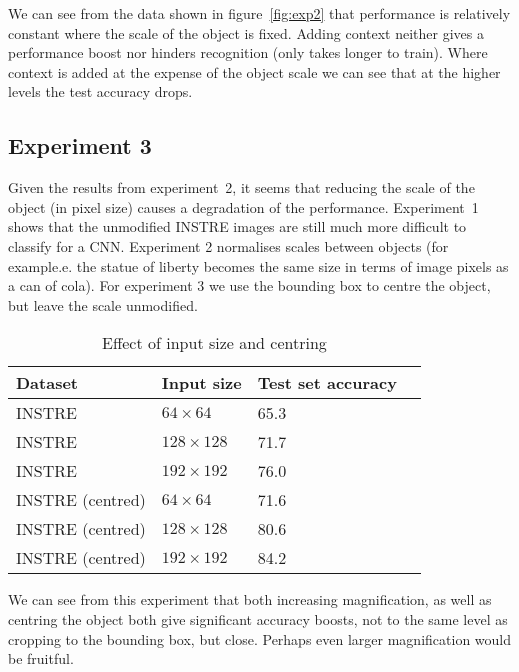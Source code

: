 We can see from the data shown in figure~\ref{fig:exp2} that performance is relatively constant where the scale of the object is fixed. Adding context neither gives a performance boost nor hinders recognition (only takes longer to train). Where context is added at the expense of the object scale we can see that at the higher levels the test accuracy drops.


\subsection {Experiment 3}

Given the results from experiment~2, it seems that reducing the scale of the object (in pixel size) causes a degradation of the performance. Experiment~1 shows that the unmodified INSTRE images are still much more difficult to classify for a CNN. Experiment 2 normalises scales between objects (for example.e. the statue of liberty becomes the same size in terms of image pixels as a can of cola). For experiment 3 we use the bounding box to centre the object, but leave the scale unmodified.


\begin{table}[h]
  \centering
    \caption{Effect of input size and centring}
    
  \begin{tabular}{ l l l l }
    
    Dataset & Input size & Test set accuracy \\
    \toprule
    
    INSTRE &  $ 64 \times 64 $ & 65.3 \\
    INSTRE &  $ 128 \times 128 $  & 71.7 \\
    INSTRE &  $ 192 \times 192 $  & 76.0 \\
    
    \toprule
    INSTRE (centred) &  $ 64 \times 64 $ & 71.6 \\
    INSTRE (centred) &  $ 128 \times 128 $  & 80.6 \\
    INSTRE (centred) &  $ 192 \times 192 $  & 84.2 \\
    
    
    
    \bottomrule
  \end{tabular}
\label{fig:input_size}
\end{table}



We can see from this experiment that both increasing magnification, as well as centring the object both give significant accuracy boosts, not to the same level as cropping to the bounding box, but close. Perhaps even larger magnification would be fruitful. 

